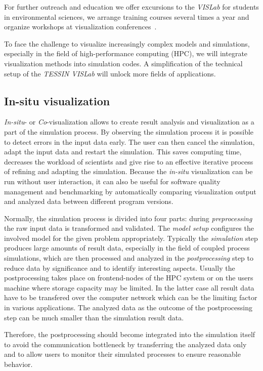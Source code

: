 \documentclass[twocolumn]{svjour3}          %
\begin{document}
For further outreach and education we offer excursions to the \emph{VISLab} for students in environmental sciences, we arrange training courses several times a year and organize workshops at visualization conferences~\cite{web:envirvis}.

To face the challenge to visualize increasingly complex models and simulations, especially in the field of high-performance computing (HPC), we will integrate visualization methods into simulation codes. A simplification of the technical setup of the \emph{TESSIN VISLab} will unlock more fields of applications.

\subsection{In-situ visualization}
\label{in-situ-visualization}

\emph{In-situ}- or \emph{Co}-visualization allows to create result analysis and visualization as a part of the simulation process. By observing the simulation process it is possible to detect errors in the input data early. The user can then cancel the simulation, adapt the input data and restart the simulation. This saves computing time, decreases the workload of scientists and give rise to an effective iterative process of refining and adapting the simulation. Because the \emph{in-situ} visualization can be run without user interaction, it can also be useful for software quality management and benchmarking by automatically comparing visualization output and analyzed data between different program versions.

Normally, the simulation process is divided into four parts: during \emph{preprocessing} the raw input data is transformed and validated. The \emph{model setup} configures the involved model for the given problem appropriately. Typically the \emph{simulation} step produces large amounts of result data, especially in the field of coupled process simulations, which are then processed and analyzed in the \emph{postprocessing} step to reduce data by significance and to identify interesting aspects. Usually the postprocessing takes place on frontend-nodes of the HPC system or on the users machine where storage capacity may be limited. In the latter case all result data have to be transfered over the computer network which can be the limiting factor in various applications. The analyzed data as the outcome of the postprocessing step can be much smaller than the simulation result data.

Therefore, the postprocessing should become integrated into the simulation itself to avoid the communication bottleneck by transferring the analyzed data only and to allow users to monitor their simulated processes to ensure reasonable behavior.
\end{document}
